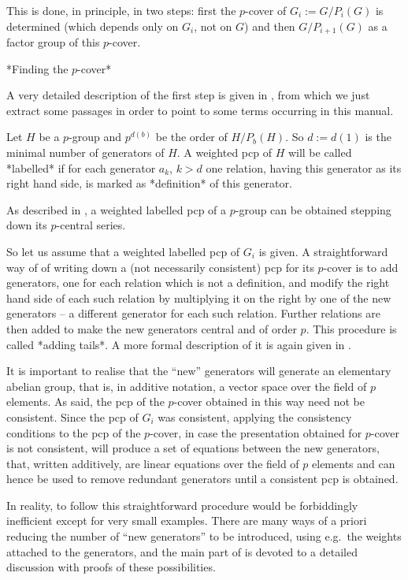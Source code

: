 This  is  done, in  principle,  in  two  steps:  first  the  $p$-cover
of $G_i := G/P_i(G)$ is determined (which depends only on
$G_i$, not on  $G$) and then $G/P_{i+1}(G)$ as a  factor group of this
$p$-cover.

*Finding the $p$-cover*

A very detailed description of  the first step is given in \cite{NNN98},
from which  we just extract  some passages in  order to point  to some
terms occurring in this manual.

Let $H$ be a $p$-group and $p^{d(b)}$ be the order of  $H/P_b(H)$.  So
$d := d(1)$ is the minimal number of generators of $H$. A weighted pcp
of $H$ will be called *labelled* if for each generator $a_k$, $k >  d$
one relation, having this generator as its right hand side, is  marked
as *definition* of this generator.

As described in \cite{NNN98}, a weighted labelled pcp of  a  $p$-group
can be obtained stepping down its $p$-central series.

So let us assume that a weighted labelled pcp of  $G_i$  is  given.  A
straightforward way of of writing down a (not necessarily  consistent)
pcp for its $p$-cover is to add  generators,  one  for  each  relation
which is not a definition, and modify the right hand side of each such
relation by multiplying it on the right by one of the  new  generators
-- a different generator for each such relation. Further relations are
then added to make the new generators central and of order  $p$.  This
procedure is called *adding tails*. A more formal description of it is
again given in \cite{NNN98}.

It is important  to realise that the ``new''  generators will generate
an elementary abelian  group, that is, in additive  notation, a vector
space  over the  field  of $p$  elements.   As said,  the  pcp of  the
$p$-cover obtained in  this way need not be  consistent. Since the pcp
of $G_i$  was consistent, applying  the consistency conditions  to the
pcp of the $p$-cover, in  case the presentation obtained for $p$-cover
is not  consistent, will  produce a set  of equations between  the new
generators, that,  written additively,  are linear equations  over the
field  of $p$  elements  and can  hence  be used  to remove  redundant
generators until a consistent pcp is obtained.

In  reality,  to  follow  this  straightforward  procedure  would   be
forbiddingly inefficient except for very  small  examples.  There  are
many ways of a priori reducing the number of ``new generators'' to  be
introduced, using e.g.~the weights attached to the generators, and the
main part of \cite{NNN98} is devoted to  a  detailed  discussion  with
proofs of these possibilities.

